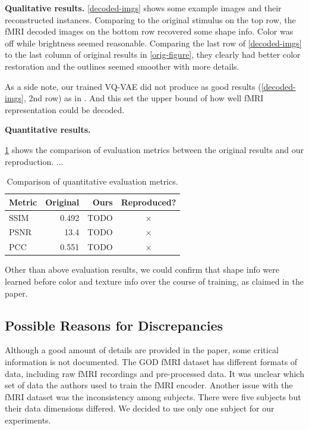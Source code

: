 \documentclass{article}
\theoremstyle{plain}
\theoremstyle{definition}
\theoremstyle{remark}
\begin{document}
\textbf{Qualitative results.} \cref{decoded-imgs} shows some example images and their reconstructed instances. Comparing to the original stimulus on the top row, the fMRI decoded  images on the bottom row recovered some shape info. Color was off while brightness seemed reasonable.
Comparing the last row of \cref{decoded-imgs} to the last column of original results in \cref{orig-figure}, they clearly had better color restoration and the outlines seemed smoother with more details.


As a side note, our trained VQ-VAE did not produce as good results (\cref{decoded-imgs}, 2nd row) as in \cite{oordNeuralDiscreteRepresentation2018}. And this set the upper bound of how well fMRI representation could be decoded.


\textbf{Quantitative results.}
\todo 

\cref{metric-table} shows the comparison of evaluation metrics between the original results and our reproduction. ...

\begin{table}[b]
\caption{Comparison of quantitative evaluation metrics.}
\label{metric-table}
\vskip 0.15in
\begin{center}
\begin{small}
\begin{sc}
\begin{tabular}{lrrc}
\toprule
Metric & Original & Ours & Reproduced? \\
\midrule
SSIM    & 0.492 & TODO & $\times$ \\
PSNR    & 13.4 &  TODO & $\times$ \\
PCC     & 0.551 & TODO & $\times$ \\
\bottomrule
\end{tabular}
\end{sc}
\end{small}
\end{center}
\vskip -0.1in
\end{table}


\medskip

Other than above evaluation results, we could confirm that shape info were learned before color and texture info over the course of training, as claimed in the paper.


\subsection{Possible Reasons for Discrepancies}
Although a good amount of details are provided in the paper, some critical information is not documented. The GOD fMRI dataset \cite{horikawa2016} has different formats of data, including raw fMRI recordings and pre-processed data. It was unclear which set of data the authors used to train the fMRI encoder. Another issue with the fMRI dataset was the inconsistency among subjects. There were five subjects but their data dimensions differed. We decided to use only one subject for our experiments.
\end{document}

